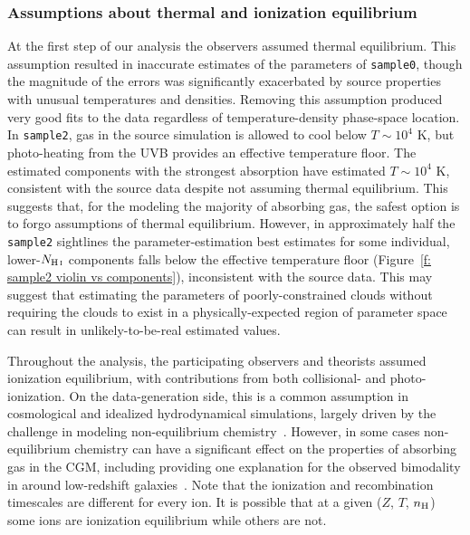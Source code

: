 \documentclass[fleqn,usenatbib]{mnras}
\begin{document}
\subsubsection{Assumptions about thermal and ionization equilibrium}

At the first step of our analysis the observers assumed thermal equilibrium.
This assumption resulted in inaccurate estimates of the parameters of \texttt{sample0}, though the magnitude of the errors was significantly exacerbated by source properties with unusual temperatures and densities.
Removing this assumption produced very good fits to the data regardless of temperature-density phase-space location.
In \texttt{sample2}, gas in the source simulation is allowed to cool below $T \sim 10^4$ K,
but photo-heating from the UVB provides an effective temperature floor.
The estimated components with the strongest absorption have estimated $T \sim 10^4$ K,
consistent with the source data despite not assuming thermal equilibrium.
This suggests that, for the modeling the majority of absorbing gas, the safest option is to forgo assumptions of thermal equilibrium.
However, in approximately half the \texttt{sample2} sightlines the parameter-estimation best estimates for some individual, lower-$N_{\ion{H}{I}}$ components falls below the effective temperature floor (Figure~\ref{f: sample2 violin vs components}),
inconsistent with the source data.
This may suggest that estimating the parameters of poorly-constrained clouds without requiring the clouds to exist in a physically-expected region of parameter space can result in unlikely-to-be-real estimated values.

Throughout the analysis, the participating observers and theorists assumed ionization equilibrium, with contributions from both collisional- and photo-ionization.
On the data-generation side, this is a common assumption in cosmological and idealized hydrodynamical simulations, largely driven by the challenge in modeling non-equilibrium chemistry~\citep[e.g.][]{richings2014Nonequilibrium}.
However, in some cases non-equilibrium chemistry can have a significant effect on the properties of absorbing gas in the CGM, including providing one explanation for the observed bimodality in  around low-redshift galaxies~\citep{oppenheimer2016Bimodality}.
Note that the ionization and recombination timescales are different for every ion.
It is possible that at a given ($Z$, $T$, $n_{\rm H}$) some ions are ionization equilibrium while others are not.
\end{document}
